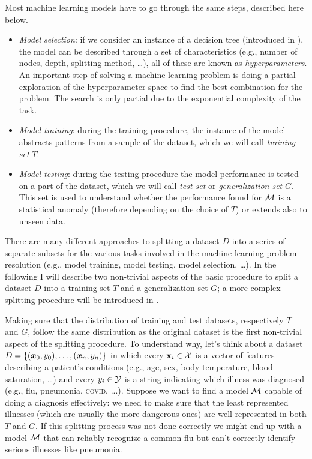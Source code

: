 Most machine learning models have to go through the same steps, described here below.
\begin{itemize}
	\item \emph{Model selection}: if we consider an instance of a decision tree (introduced in
	      ), the model can be described through a set of characteristics (e.g.,
	      number of nodes, depth, splitting method, \ldots), all of these are known as
	      \emph{hyperparameters}. An important step of solving a machine learning problem is
	      doing a partial exploration of the hyperparameter space to find the best combination
		for the problem. The search is only partial due to the exponential complexity of the task.
	\item \emph{Model training}: during the training procedure, the instance of the model abstracts
	      patterns from a sample of the dataset, which we will call \emph{training set} $T$.
	\item \emph{Model testing}: during the testing procedure the model performance is tested on
		a part of the dataset, which we will call \emph{test set} or \emph{generalization
		set} $G$. This set is used to understand whether the performance found for $\mathcal{M}$
		is a statistical anomaly (therefore depending on the choice of $T$) or extends also to unseen data.
\end{itemize}

There are many different approaches to splitting a dataset $D$ into a series of separate subsets
for the various tasks involved in the machine learning problem resolution (e.g., model training,
model testing, model selection, \ldots). In the following I will describe two non-trivial aspects of
the basic procedure to split a dataset $D$ into a training set $T$ and a generalization set $G$; a
more complex splitting procedure will be introduced in .

\smallskip

Making sure that the distribution of training and test datasets, respectively $T$ and $G$, follow the
same distribution as the original dataset is the first non-trivial aspect of the splitting
procedure. To understand why, let's think about a dataset $D = \{(\boldsymbol{x}_0, y_0), \ldots, (\boldsymbol{x}_n, y_n)\}$ in which every $\mathbf{x}_i \in
\mathcal{X}$ is a vector of features describing a patient's conditions (e.g., age, sex, body temperature,
blood saturation, \ldots) and every $y_i \in \mathcal{Y}$ is a string indicating which illness was
diagnosed (e.g., flu, pneumonia, \textsc{covid}, ...). Suppose we want to find a model $\mathcal{M}$ capable of doing a diagnosis effectively: we need to make sure that the least represented illnesses (which are usually the more dangerous ones) are well represented in both $T$ and $G$. If this splitting process was not done correctly we might end up with a model $\mathcal{M}$ that can reliably recognize a common flu but can't correctly identify serious illnesses like pneumonia.

